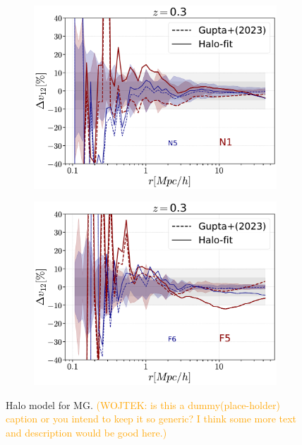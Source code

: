 \documentclass[%
 reprint,
groupedaddress,
nofootinbib,
nobibnotes,
 amsmath,amssymb,
 aps,
]{revtex4-2}
\newcommand{\<}{\langle}
\renewcommand{\>}{\rangle}
\newcommand{\WH}[1]{\textcolor{orange}{(WOJTEK: #1)}}
\begin{document}
\begin{figure}
    \centering
    \begin{subfigure}[c]{0.45\textwidth}
        \includegraphics[width=\textwidth]{figs/shaded_ratio_v12_HM_HF_N1_N5z03}
        \label{fig:ndgp}
    \end{subfigure}
    \begin{subfigure}[c]{0.45\textwidth}
        \includegraphics[width=\textwidth]{figs/shaded_ratio_v12_HM_HF_F5_F6z03}
        \label{fig:fofr}
    \end{subfigure}
    \caption{Halo model for MG.  \WH{is this a dummy(place-holder) caption or you intend to keep it so generic? I think some more text and description would be good here.}}\label{fig:hm}
\end{figure}
\end{document}
